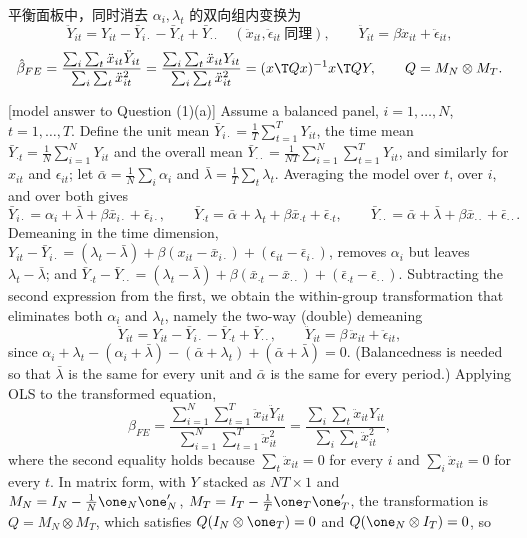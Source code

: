 \begin{thm}[第 1(a) 题答案]
平衡面板中，同时消去 $\alpha_i,\lambda_t$ 的双向组内变换为
\[
\ddot Y_{it}=Y_{it}-\bar Y_{i\cdot}-\bar Y_{\cdot t}+\bar Y_{\cdot\cdot}\quad(\ddot x_{it},\ddot\epsilon_{it}\ \text{同理}),\qquad \ddot Y_{it}=\beta\ddot x_{it}+\ddot\epsilon_{it},
\]
\[
\hat\beta_{FE}=\frac{\sum_i\sum_t\ddot x_{it}\ddot Y_{it}}{\sum_i\sum_t\ddot x_{it}^2}=\frac{\sum_i\sum_t\ddot x_{it}Y_{it}}{\sum_i\sum_t\ddot x_{it}^2}=(x\T Qx)^{-1}x\T QY,\qquad Q=M_N\otimes M_T .
\]
\end{thm}

\begin{english}[model answer to Question (1)(a)]
Assume a balanced panel, $i=1,\dots,N$, $t=1,\dots,T$. Define the unit mean $\bar Y_{i\cdot}=\frac1T\sum_{t=1}^TY_{it}$, the time mean $\bar Y_{\cdot t}=\frac1N\sum_{i=1}^NY_{it}$ and the overall mean $\bar Y_{\cdot\cdot}=\frac1{NT}\sum_{i=1}^N\sum_{t=1}^TY_{it}$, and similarly for $x_{it}$ and $\epsilon_{it}$; let $\bar\alpha=\frac1N\sum_i\alpha_i$ and $\bar\lambda=\frac1T\sum_t\lambda_t$. Averaging the model over $t$, over $i$, and over both gives
\[
\bar Y_{i\cdot}=\alpha_i+\bar\lambda+\beta\bar x_{i\cdot}+\bar\epsilon_{i\cdot},\qquad
\bar Y_{\cdot t}=\bar\alpha+\lambda_t+\beta\bar x_{\cdot t}+\bar\epsilon_{\cdot t},\qquad
\bar Y_{\cdot\cdot}=\bar\alpha+\bar\lambda+\beta\bar x_{\cdot\cdot}+\bar\epsilon_{\cdot\cdot}.
\]
Demeaning in the time dimension, $Y_{it}-\bar Y_{i\cdot}=(\lambda_t-\bar\lambda)+\beta(x_{it}-\bar x_{i\cdot})+(\epsilon_{it}-\bar\epsilon_{i\cdot})$, removes $\alpha_i$ but leaves $\lambda_t-\bar\lambda$; and $\bar Y_{\cdot t}-\bar Y_{\cdot\cdot}=(\lambda_t-\bar\lambda)+\beta(\bar x_{\cdot t}-\bar x_{\cdot\cdot})+(\bar\epsilon_{\cdot t}-\bar\epsilon_{\cdot\cdot})$. Subtracting the second expression from the first, we obtain the within-group transformation that eliminates both $\alpha_i$ and $\lambda_t$, namely the two-way (double) demeaning
\[
\ddot Y_{it}=Y_{it}-\bar Y_{i\cdot}-\bar Y_{\cdot t}+\bar Y_{\cdot\cdot},\qquad \ddot Y_{it}=\beta\,\ddot x_{it}+\ddot\epsilon_{it},
\]
since $\alpha_i+\lambda_t-(\alpha_i+\bar\lambda)-(\bar\alpha+\lambda_t)+(\bar\alpha+\bar\lambda)=0$. (Balancedness is needed so that $\bar\lambda$ is the same for every unit and $\bar\alpha$ is the same for every period.) Applying OLS to the transformed equation,
\[
\hat\beta_{FE}=\frac{\sum_{i=1}^N\sum_{t=1}^T\ddot x_{it}\ddot Y_{it}}{\sum_{i=1}^N\sum_{t=1}^T\ddot x_{it}^2}=\frac{\sum_i\sum_t\ddot x_{it}Y_{it}}{\sum_i\sum_t\ddot x_{it}^2},
\]
where the second equality holds because $\sum_t\ddot x_{it}=0$ for every $i$ and $\sum_i\ddot x_{it}=0$ for every $t$. In matrix form, with $Y$ stacked as $NT\times1$ and $M_N=I_N-\frac1N\one_N\one_N'$, $M_T=I_T-\frac1T\one_T\one_T'$, the transformation is $Q=M_N\otimes M_T$, which satisfies $Q(I_N\otimes\one_T)=0$ and $Q(\one_N\otimes I_T)=0$, so

\end{english}
